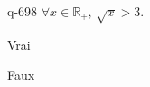 \begin{truefalse}{q-698}
$\forall x \in \mathbb R_+,\: \sqrt x > 3$.
\item Vrai
\item* Faux
\end{truefalse}

